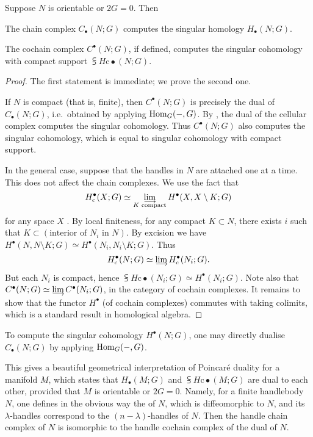 \begin{proposition}\label{prop:handle-homology}
Suppose $N$ is orientable or $2G=0$. Then 
\begin{itms}
    \item The chain complex $C_\bullet(N;G)$ computes
    the singular homology $H_\bullet(N;G)$.
    \item The cochain complex $C^\bullet(N;G)$, if defined, computes
    the singular cohomology with compact support $\subsup H{\mathrm c}\bullet(N;G)$.
\end{itms}
\end{proposition}

\begin{proof}
The first statement is immediate; we prove the second one.

If $N$ is compact (that is, finite), 
then $C^\bullet(N;G)$ is precisely the dual of $C_\bullet(N;G)$,
i.e.\ obtained by applying $\operatorname{Hom}_G(-,G)$.
By \cite[Theorem~3.5]{hatcher},
the dual of the cellular complex computes the singular cohomology.
Thus $C^\bullet(N;G)$ also computes the singular cohomology,
which is equal to singular cohomology with compact support.

In the general case, suppose that the handles in $N$ are attached
one at a time. This does not affect the chain complexes.
We use the fact that
\[\subsup H{\mathrm c}\bullet(X;G)
\simeq\limdct_{\raisebox{2pt}[0pt]{\scriptsize$K$ compact}} H^\bullet(X,X\setminus K;G)\]
for any space $X$ \cite[below~3.33]{hatcher}.
By local finiteness, for any compact $K\subset N$,
there exists $i$ such that $K\subset(\text{interior of $N_i$ in $N$})$.
By excision we have $H^\bullet(N,N\setminus K;G)\simeq H^\bullet(N_i,N_i\setminus K;G)$. Thus
\[\subsup H{\mathrm c}\bullet(N;G)\simeq\limdct\subsup H{\mathrm c}\bullet(N_i;G).\]
But each $N_i$ is compact, hence
$\subsup H{\mathrm c}\bullet(N_i;G)\simeq H^\bullet(N_i;G)$.
Note also that $C^\bullet(N;G)\simeq\limdct C^\bullet(N_i;G)$,
in the category of cochain complexes.
It remains to show that the functor $H^\bullet$ (of cochain complexes) commutes with taking colimits,
which is a standard result in homological algebra.
\end{proof}

\begin{remark}
To compute the singular cohomology $H^\bullet(N;G)$,
one may directly dualise $C_\bullet(N;G)$
by applying $\operatorname{Hom}_G(-,G)$. \varqed
\end{remark}

\begin{remark}
This gives a beautiful geometrical interpretation
of Poincar\'e duality for a manifold $M$,
which states that $H_\bullet(M;G)$ and $\subsup H{\mathrm{c}}{\bullet}(M;G)$ are dual to each other,
provided that $M$ is orientable or $2G=0$.
Namely, for a finite handlebody $N$,
one defines in the obvious way the  of $N$,
which is diffeomorphic to $N$,
and its $\lambda$-handles correspond to the $(n-\lambda)$-handles of $N$.
Then the handle chain complex of $N$ is isomorphic to 
the handle cochain complex of the dual of $N$.\varqed
\end{remark}
